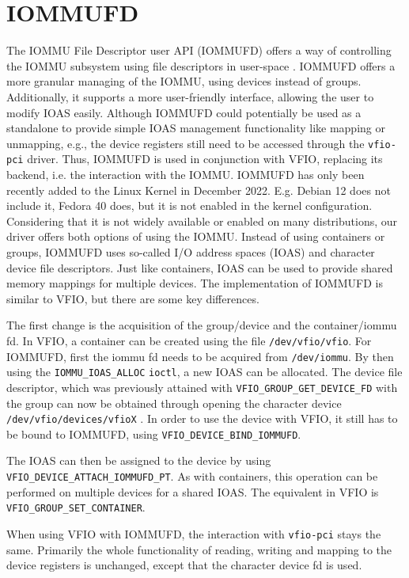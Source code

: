 \section{IOMMUFD}
The IOMMU File Descriptor user API (IOMMUFD) offers a way of controlling the IOMMU subsystem using file descriptors in user-space \cite{iommufdkerneldocs}. IOMMUFD offers a more granular managing of the IOMMU, using devices instead of groups. Additionally, it supports a more user-friendly interface, allowing the user to modify IOAS easily. Although IOMMUFD could potentially be used as a standalone to provide simple IOAS management functionality like mapping or unmapping, e.g., the device registers still need to be accessed through the \texttt{vfio-pci} driver. Thus, IOMMUFD is used in conjunction with VFIO, replacing its backend, i.e. the interaction with the IOMMU.
IOMMUFD has only been recently added to the Linux Kernel in December 2022. E.g. Debian 12 does not include it, Fedora 40 does, but it is not enabled in the kernel configuration. Considering that it is not widely available or enabled on many distributions, our driver offers both options of using the IOMMU.
Instead of using containers or groups, IOMMUFD uses so-called I/O address spaces (IOAS) and character device file descriptors. Just like containers, IOAS can be used to provide shared memory mappings for multiple devices. The implementation of IOMMUFD is similar to VFIO, but there are some key differences.

The first change is the acquisition of the group/device and the container/iommu fd.
In VFIO, a container can be created using the file \texttt{/dev/vfio/vfio}. For IOMMUFD, first the iommu fd needs to be acquired from \texttt{/dev/iommu}. By then using the \texttt{IOMMU\_IOAS\_ALLOC} \texttt{ioctl}, a new IOAS can be allocated.
The device file descriptor, which was previously attained with \texttt{VFIO\_GROUP\_GET\_DEVICE\_FD} with the group can now be obtained through opening the character device \texttt{/dev/vfio/devices/vfioX} \cite{vfiokerneldocs}. In order to use the device with VFIO, it still has to be bound to IOMMUFD, using \texttt{VFIO\_DEVICE\_BIND\_IOMMUFD}.


The IOAS can then be assigned to the device by using \texttt{VFIO\_DEVICE\_ATTACH\_IOMMUFD\_PT}. As with containers, this operation can be performed on multiple devices for a shared IOAS. The equivalent in VFIO is \texttt{VFIO\_GROUP\_SET\_CONTAINER}.

When using VFIO with IOMMUFD, the interaction with \texttt{vfio-pci} stays the same. Primarily the whole functionality of reading, writing and mapping to the device registers is unchanged, except that the character device fd is used.

